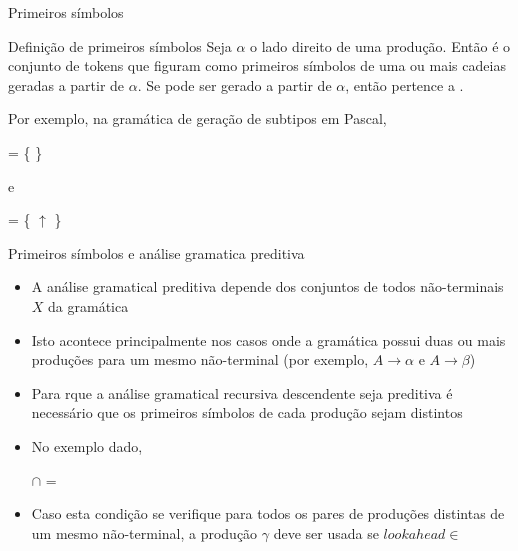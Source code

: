 \begin{frame}[fragile]{Primeiros símbolos}

    \begin{block}{Definição de primeiros símbolos}
        Seja $\alpha$ o lado direito de uma produção. Então  é o conjunto de tokens que figuram como primeiros símbolos de uma ou mais
        cadeias geradas a partir de $\alpha$. Se  pode ser gerado a partir de $\alpha$, então  pertence a .
    \end{block}

    \vspace{0.2in}
    Por exemplo, na gramática de geração de subtipos em Pascal, 

    \begin{center} = \{  \}\end{center}

    e

    \begin{center} = \{ $\uparrow$ \}\end{center}
    
\end{frame}

\begin{frame}[fragile]{Primeiros símbolos e análise gramatica preditiva}

    \begin{itemize}
        \item A análise gramatical preditiva depende dos conjuntos  de todos não-terminais $X$ da gramática
        \pause

        \item Isto acontece principalmente nos casos onde a gramática possui duas ou mais produções para um mesmo não-terminal (por exemplo, $A \to \alpha$ e 
        $A\to \beta$)
        \pause

        \item Para rque a análise gramatical recursiva descendente seja preditiva é necessário que os primeiros símbolos de cada produção sejam distintos
        \pause

        \item No exemplo dado,

        \begin{center}
         $\cap$  = \emptyset
        \end{center}
        \pause

        \item Caso esta condição se verifique para todos os pares de produções distintas de um mesmo não-terminal, a produção $\gamma$ deve ser usada se
        $lookahead \in$ 
    \end{itemize}

\end{frame}


